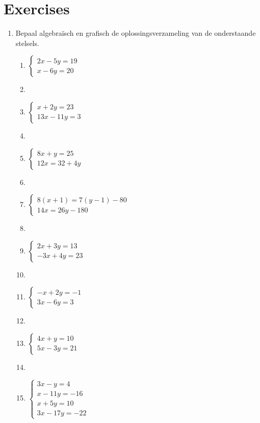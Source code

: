 \section{Exercises}
\begin{enumerate}

\item Bepaal algebra\"isch en grafisch de oplossingsverzameling van de onderstaande stelsels.
\begin{multicols}{2}
\begin{enumerate}
\item $\left\{\begin{array}{l}
2x - 5y = 19 \\
x - 6y = 20
\end{array} \right. $
\item []
\item $\left\{\begin{array}{l}
x + 2y = 23 \\
13x - 11y = 3
\end{array} \right. $
\item []
\item $\left\{\begin{array}{l}
8x + y = 25 \\
12x = 32 + 4y
\end{array} \right. $
\item []
\item $\left\{\begin{array}{l}
8(x + 1) = 7(y - 1) - 80 \\
14x = 26y - 180
\end{array} \right. $
\item []
\item $\left\{\begin{array}{l}
2x + 3y = 13 \\
-3x + 4y = 23
\end{array} \right. $
\item []
\item $\left\{\begin{array}{l}
-x + 2y = -1 \\
3x -6y = 3
\end{array} \right. $
\item []
\item $\left\{\begin{array}{l}
4x + y = 10 \\
5x -3y = 21
\end{array} \right. $


\item []
\item $\left\{\begin{array}{l}
3x - y = 4 \\
x -11y = -16 \\
x+5y = 10 \\
3x-17y=-22
\end{array} \right. $


\end{enumerate}
\end{multicols}
\end{enumerate}
